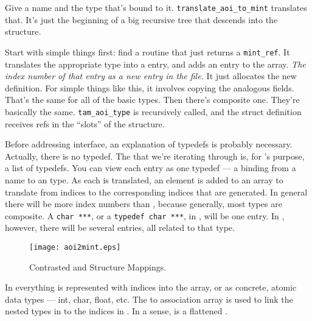 Give a name and the \AOI{} type that's bound to it.
\texttt{translate\_aoi\_to\_mint} translates that.  It's just the beginning of
a big recursive tree that descends into the \AOI{} structure.

Start with simple things first: find a routine that just returns a
\texttt{mint\_ref}.  It translates the appropriate \AOI{} type into a \MINT{} entry,
and adds an entry to the \MINT{} array.  \emph{The index number of that entry as a
new entry in the \MINT{} file.}  It just allocates the new definition.  For simple
things like this, it involves copying the analogous fields.  That's the same
for all of the basic types.  Then there's composite one.  They're basically the
same.  \texttt{tam\_aoi\_type} is recursively called, and the \MINT{} struct
definition receives \MINT{} refs in the ``slots'' of the structure.

Before addressing interface, an explanation of typedefs is probably
necessary.  Actually, there is no typedef.  The \AOI{} that we're
iterating through is, for \MINT{}'s purpose, a list of typedefs.  You can
view each \AOI{} entry as one typedef --- a binding from a name to an \AOI{} type.
As each is translated, an element is added to an array to translate from \AOI{}
indices to the corresponding \MINT{} indices that are generated.  In general there
will be more \MINT{} index numbers than \AOI{}, because generally, most \AOI{} types are
composite.  A \texttt{char~***}, or a \texttt{typedef char~***}, in \AOI{}, will
be one entry.  In \MINT{}, however, there will be several entries, all related to
that type.

\begin{figure}
  \begin{center}
    \texttt{[image: aoi2mint.eps]}
  \end{center}
  \caption{Contrasted \AOI{} and \MINT{} Structure Mappings.}
  \label{aoi2mint}
\end{figure}

In \MINT{} everything is represented with indices into the \MINT{} array, or as
concrete, atomic data types --- int, char, float, etc.  The \AOI{} to \MINT{}
association array is used to link the nested types in \AOI{} to the indices in
\MINT{}\@.  In a sense, \MINT{} is a flattened \AOI{}\@.

